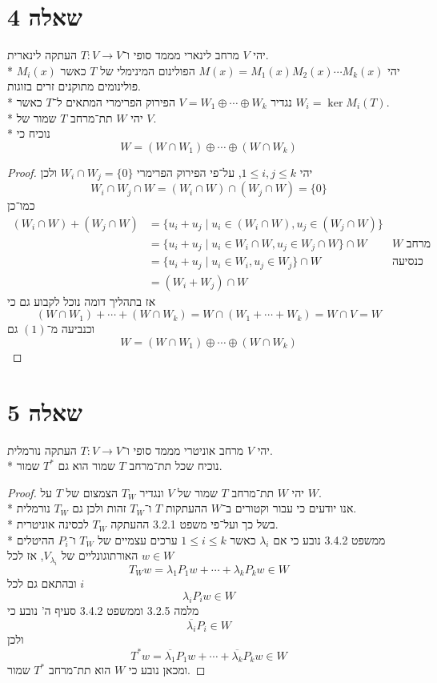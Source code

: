 \section{שאלה 4}
יהי $V$ מרחב לינארי מממד סופי ו־$T : V \to V$ העתקה לינארית. \\*
יהי $M(x) = M_1(x) M_2(x) \cdots M_k(x)$ הפולינום המינימלי של $T$ כאשר $M_i(x)$ פולינומים מתוקנים זרים בזוגות. \\*
נגדיר $V = W_1 \oplus \cdots \oplus W_k$ הפירוק הפרימרי המתאים ל־$T$ כאשר $W_i = \ker M_i(T)$. \\*
יהי $W$ תת־מרחב $T$ שמור של $V$. \\*
נוכיח כי
\[
	W = (W \cap W_1) \oplus \cdots \oplus (W \cap W_k)
\]
\begin{proof}
	יהי $1 \le i, j \le k$, על־פי הפירוק הפרימרי $W_i \cap W_j = \{0\}$ ולכן
	\[
		W_i \cap W_j \cap W = (W_i \cap W) \cap (W_j \cap W) = \{ 0 \} \tag{1}
	\]
	כמו־כן
	\begin{align*}
		(W_i \cap W) + \left(W_j \cap W\right)
		& = \{ u_i + u_j \mid u_i \in (W_i \cap W), u_j \in (W_j \cap W) \} \\
		& = \{ u_i + u_j \mid u_i \in W_i \cap W, u_j \in W_j \cap W \} \cap W & \text{$W$ מרחב לינארי} \\
		& = \{ u_i + u_j \mid u_i \in W_i, u_j \in W_j \} \cap W & \text{כנסיעה מתכונות המרחב} \\
		& = (W_i + W_j) \cap W
	\end{align*}
	אז בתהליך דומה נוכל לקבוע גם כי
	\[
		(W \cap W_1) + \cdots + (W \cap W_k) = W \cap (W_1 + \cdots + W_k) = W \cap V = W
	\]
	וכנביעה מ־$(1)$ גם
	\[
		W = (W \cap W_1) \oplus \cdots \oplus (W \cap W_k)
	\]
\end{proof}

\section{שאלה 5}
יהי $V$ מרחב אוניטרי מממד סופי ו־$T : V \to V$ העתקה נורמלית. \\*
נוכיח שכל תת־מרחב $T$ שמור הוא גם $T^*$ שמור.
\begin{proof}
	יהי $W$ תת־מרחב $T$ שמור של $V$ ונגדיר $T_W$ הצמצום של $T$ על $W$. \\*
	אנו יודעים כי עבור וקטורים ב־$W$ ההעתקות $T$ ו־$T_W$ זהות ולכן גם $T_W$ נורמלית. \\*
	בשל כך ועל־פי משפט 3.2.1 ההעתקה $T_W$ לכסינה אוניטרית. \\*
	ממשפט 3.4.2 נובע כי אם $\lambda_i$ כאשר $1 \le i \le k$ ערכים עצמיים של $T_W$ ו־$P_i$ ההיטלים האורתוגונליים של $V_{\lambda_i}$, אז לכל $w \in W$
	\[
		T_W w = \lambda_1 P_1 w + \cdots + \lambda_k P_k w \in W
	\]
	ובהתאם גם לכל $i$
	\[
		\lambda_i P_i w \in W
	\]
	מלמה 3.2.5 וממשפט 3.4.2 סעיף ה' נובע כי
	\[
		\overline{\lambda_i} P_i \in W
	\]
	ולכן
	\[
		T^* w = \overline{\lambda_1} P_1 w + \cdots + \overline{\lambda_k} P_k w \in W
	\]
	ומכאן נובע כי $W$ הוא תת־מרחב $T^*$ שמור.
\end{proof}



